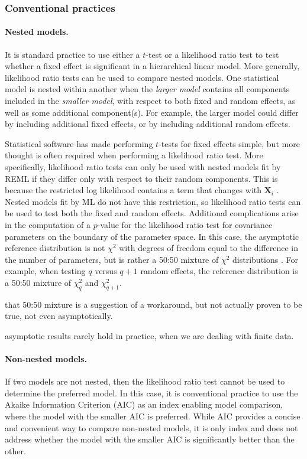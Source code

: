 \documentclass{article} %
\newcommand{\hh}[1]{{\color{orange} #1}}
\begin{document}
\subsubsection{Conventional practices}

\paragraph{Nested models.}
It is standard practice to use either a $t$-test or a likelihood ratio test to test whether a fixed effect is significant in a hierarchical linear model. More generally, likelihood ratio tests can be used to compare nested models. One statistical model is nested within another when the \emph{larger model} contains all components included in the \emph{smaller model}, with respect to both fixed and random effects, as well as some additional component(s). For example, the larger model could differ by including additional fixed effects, or by including additional random effects. 

Statistical software has made performing $t$-tests for fixed effects simple, but more thought is often required when performing a likelihood ratio test. More specifically, likelihood ratio tests can only be used with nested models fit by REML if they differ only with respect to their random components. This is because the restricted log likelihood contains a term that changes with $\bm{X}_i$ \citep[c.f.,][Section 2.2.5]{Pinhiero:2000vf}. Nested models fit by ML do not have this restriction, so likelihood ratio tests can be used to test both the fixed and random effects. Additional complications arise in the computation of a $p$-value for the likelihood ratio test for covariance parameters on the boundary of the parameter space. In this case, the asymptotic reference distribution is not $\chi^2$ with degrees of freedom equal to the difference in the number of parameters, but is rather a 50:50 mixture of $\chi^2$ distributions \citep{Self:1987wb, Stram:1994wd}. For example, when testing $q$ versus $q + 1$ random effects, the reference distribution is a 50:50 mixture of $\chi^2_q$ and $\chi^2_{q+1}$.

\hh{that 50:50 mixture is a suggestion of a workaround, but not actually proven to be true, not even asymptotically. }

\hh{asymptotic results rarely hold in practice, when we are dealing with finite data.}

\paragraph{Non-nested models.}
If two models are not nested, then the likelihood ratio test cannot be used to determine the preferred model. In this case, it is conventional practice to use the Akaike Information Criterion (AIC) as an index enabling model comparison, where the model with the smaller AIC is preferred. While AIC provides a concise and convenient way to compare non-nested models, it is only index and does not address whether the model with the smaller AIC is significantly better than the other.
\end{document}
